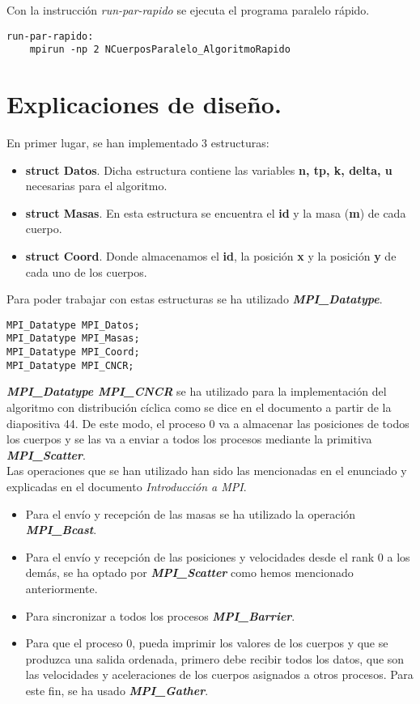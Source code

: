 \documentclass[11pt]{article}
\begin{document}
Con la instrucción \textit{run-par-rapido} se ejecuta el programa paralelo rápido.
\begin{lstlisting}[style=C,numbers=none]
run-par-rapido:
	mpirun -np 2 NCuerposParalelo_AlgoritmoRapido
\end{lstlisting}


\newpage
\section{Explicaciones de diseño.}
En primer lugar, se han implementado 3 estructuras:
\begin{itemize}
	\item \textbf{struct Datos}. Dicha estructura contiene las variables \textbf{n, tp, k, delta, u} necesarias para el algoritmo.
	
	\item \textbf{struct Masas}. En esta estructura se encuentra el \textbf{id} y la masa (\textbf{m}) de cada cuerpo.
	
	\item \textbf{struct Coord}. Donde almacenamos el \textbf{id}, la posición \textbf{x} y la posición \textbf{y} de cada uno de los cuerpos.
\end{itemize}

Para poder trabajar con estas estructuras se ha utilizado \textbf{\textit{MPI\_Datatype}}.
\begin{lstlisting}[style=C,numbers=none]
MPI_Datatype MPI_Datos;
MPI_Datatype MPI_Masas;
MPI_Datatype MPI_Coord;
MPI_Datatype MPI_CNCR;
\end{lstlisting}
\textbf{\textit{MPI\_Datatype MPI\_CNCR}} se ha utilizado para la implementación del algoritmo con distribución cíclica como se dice en el documento a partir de la diapositiva 44. De este modo, el proceso 0 va a almacenar las posiciones de todos los cuerpos y se las va a enviar a todos los procesos mediante la primitiva \textbf{\textit{MPI\_Scatter}}. \\

Las operaciones que se han utilizado han sido las mencionadas en el enunciado y explicadas en el documento \textit{Introducción a MPI}. \\
\begin{itemize}
	\item Para el envío y recepción de las masas se ha utilizado la operación \textbf{\textit{MPI\_Bcast}}.
	\item Para el envío y recepción de las posiciones y velocidades desde el rank 0 a los demás, se ha optado por 						\textbf{\textit{MPI\_Scatter}} como hemos mencionado anteriormente.
	\item Para sincronizar a todos los procesos \textbf{\textit{MPI\_Barrier}}.
	\item Para que el proceso 0, pueda imprimir los valores de los cuerpos y que se produzca una salida ordenada, primero debe 			recibir todos los datos, que son las velocidades y aceleraciones de los cuerpos asignados a otros procesos. Para este fin, se 	ha usado \textbf{\textit{MPI\_Gather}}.
\end{itemize}
\end{document}
